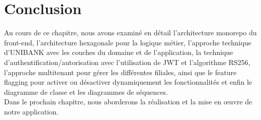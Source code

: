 \section{Conclusion}
Au cours de ce chapitre, nous avons examiné en détail l'architecture monorepo du front-end, l'architecture hexagonale pour la logique métier, l'approche technique d'UNIBANK avec les couches du domaine et de l'application, la technique d'authentification/autorisation avec l'utilisation de JWT et l'algorithme RS256, l'approche multitenant pour gérer les différentes filiales, ainsi que le feature flagging pour activer ou désactiver dynamiquement les fonctionnalités et enfin le diagramme de classe et les diagrammes de séquences.\\
Dans le prochain chapitre, nous aborderons la réalisation et la mise en œuvre de notre application.
